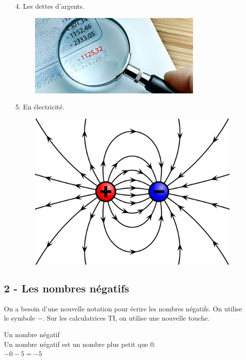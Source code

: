 \begin{multicols}{3}
\begin{enumerate}
  \item[4.] Les dettes d'argents. 
  \begin{figure}[H]
    \centering
    \includegraphics[width=0.8\linewidth]{5x3-nombres-relatifs-1-intro/c-argent.png}
  \end{figure}
  \item[5.] En électricité. 
  \begin{figure}[H]
    \centering
    \includegraphics[width=0.8\linewidth]{5x3-nombres-relatifs-1-intro/c-elec.png}
  \end{figure} 
\end{enumerate}
\end{multicols}

\subsection*{2 - Les nombres négatifs}

On a besoin d'une nouvelle notation pour écrire les nombres négatifs. On utilise le symbole $-$. Sur les calculatrices TI, on utilise une nouvelle touche.\\


\begin{Definition}{Un nombre négatif}\\
  Un nombre négatif est un nombre plus petit que 0. \\
  $-0 - 5 = -5$
\end{Definition}


